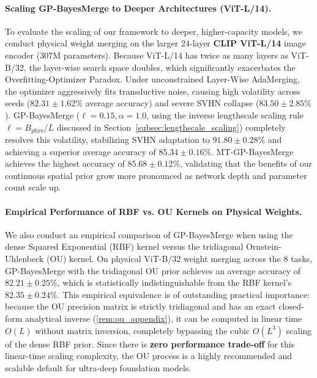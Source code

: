 \paragraph{Scaling GP-BayesMerge to Deeper Architectures (ViT-L/14).}
To evaluate the scaling of our framework to deeper, higher-capacity models, we
conduct physical weight merging on the larger 24-layer \textbf{CLIP ViT-L/14}
image encoder (307M parameters). Because ViT-L/14 has twice as many layers as
ViT-B/32, the layer-wise search space doubles, which significantly exacerbates
the Overfitting-Optimizer Paradox. Under unconstrained Layer-Wise AdaMerging,
the optimizer aggressively fits transductive noise, causing high volatility
across seeds ($82.31 \pm 1.62\%$ average accuracy) and severe SVHN collapse
($83.50 \pm 2.85\%$). GP-BayesMerge ($\ell=0.15, \alpha=1.0$, using the inverse
lengthscale scaling rule $\ell = B_{\text{phys}}/L$ discussed in
Section~\ref{subsec:lengthscale_scaling}) completely resolves this volatility,
stabilizing SVHN adaptation to $91.80 \pm 0.28\%$ and achieving a superior
average accuracy of $85.34 \pm 0.16\%$. MT-GP-BayesMerge achieves the highest
accuracy of $85.68 \pm 0.12\%$, validating that the benefits of our continuous
spatial prior grow more pronounced as network depth and parameter count scale
up.

\paragraph{Empirical Performance of RBF vs. OU Kernels on Physical Weights.}
We also conduct an empirical comparison of GP-BayesMerge when using the dense
Squared Exponential (RBF) kernel versus the tridiagonal Ornstein-Uhlenbeck (OU)
kernel. On physical ViT-B/32 weight merging across the 8 tasks, GP-BayesMerge
with the tridiagonal OU prior achieves an average accuracy of $82.21 \pm
0.25\%$, which is statistically indistinguishable from the RBF kernel's $82.35
\pm 0.24\%$. This empirical equivalence is of outstanding practical importance:
because the OU precision matrix is strictly tridiagonal and has an exact
closed-form analytical inverse (\cref{rem:ou_appendix}), it can be
computed in linear time $O(L)$ without matrix inversion, completely bypassing
the cubic $O(L^3)$ scaling of the dense RBF prior. Since there is \textbf{zero
performance trade-off} for this linear-time scaling complexity, the OU process
is a highly recommended and scalable default for ultra-deep foundation models.

